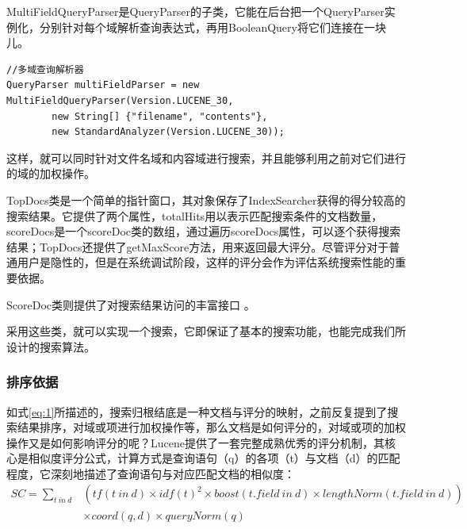 \documentclass[12pt,a4paper]{article}
\begin{document}
	MultiFieldQueryParser是QueryParser的子类，它能在后台把一个QueryParser实例化，分别针对每个域解析查询表达式，再用BooleanQuery将它们连接在一块儿。
	\lstset{language=Java,frame=lines}
	\begin{lstlisting}
//多域查询解析器
QueryParser multiFieldParser = new MultiFieldQueryParser(Version.LUCENE_30, 
		new String[] {"filename", "contents"},
		new StandardAnalyzer(Version.LUCENE_30));
	\end{lstlisting}
	
	这样，就可以同时针对文件名域和内容域进行搜索，并且能够利用之前对它们进行的域的加权操作。
	
	\vspace{6pt}
	
	TopDocs类是一个简单的指针窗口，其对象保存了IndexSearcher获得的得分较高的搜索结果。它提供了两个属性，totalHits用以表示匹配搜索条件的文档数量，scoreDocs是一个scoreDoc类的数组，通过遍历scoreDocs属性，可以逐个获得搜索结果；TopDocs还提供了getMaxScore方法，用来返回最大评分。尽管评分对于普通用户是隐性的，但是在系统调试阶段，这样的评分会作为评估系统搜索性能的重要依据。
	\vspace{6pt}
	
	ScoreDoc类则提供了对搜索结果访问的丰富接口
	\vspace{6pt}。
	
	采用这些类，就可以实现一个搜索，它即保证了基本的搜索功能，也能完成我们所设计的搜索算法。
	
		\subsubsection{排序依据}
	
	如式\ref{eq:1}所描述的，搜索归根结底是一种文档与评分的映射，之前反复提到了搜索结果排序，对域或项进行加权操作等，那么文档是如何评分的，对域或项的加权操作又是如何影响评分的呢？Lucene提供了一套完整成熟优秀的评分机制，其核心是相似度评分公式，计算方式是查询语句（q）的各项（t）与文档（d）的匹配程度，它深刻地描述了查询语句与对应匹配文档的相似度：
	\begin{equation}\label{eq:luceneScore}
	\begin{aligned}
SC = \sum_{t\ in\ d}&(tf(t\ in\ d)\times idf(t)^2 \times boost(t.field\ in\ d) \times lengthNorm(t.field\ in\ d)) \\
   				    & \times coord(q,d) \times queryNorm(q)
    \end{aligned}
	\end{equation}
	
\end{document}

